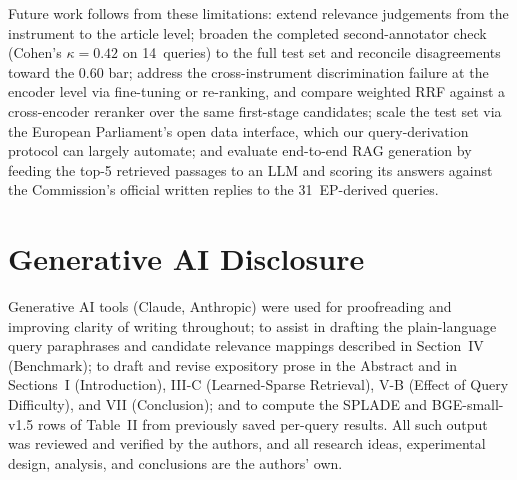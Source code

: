 \documentclass[conference,a4paper]{IEEEtran}
\begin{document}
Future work follows from these limitations: extend relevance
judgements from the instrument to the article level; broaden the
completed second-annotator check (Cohen's $\kappa{=}0.42$ on
14~queries) to the full test set and reconcile disagreements toward
the $0.60$ bar; address the cross-instrument discrimination failure at
the encoder level via fine-tuning or re-ranking, and compare weighted
RRF against a cross-encoder reranker over the same first-stage
candidates; scale the test set via the European Parliament's open
data interface, which our query-derivation protocol can largely
automate; and evaluate end-to-end RAG generation by feeding the top-5
retrieved passages to an LLM and scoring its answers against the
Commission's official written replies to the 31~EP-derived queries.

\section*{Generative AI Disclosure}

Generative AI tools (Claude, Anthropic) were used for proofreading and improving clarity of writing throughout; to assist in drafting the plain-language query paraphrases and candidate relevance mappings described in Section~IV (Benchmark); to draft and revise expository prose in the Abstract and in Sections~I (Introduction), III-C (Learned-Sparse Retrieval), V-B (Effect of Query Difficulty), and VII (Conclusion); and to compute the SPLADE and BGE-small-v1.5 rows of Table~II from previously saved per-query results. All such output was reviewed and verified by the authors, and all research ideas, experimental design, analysis, and conclusions are the authors' own.
\end{document}
